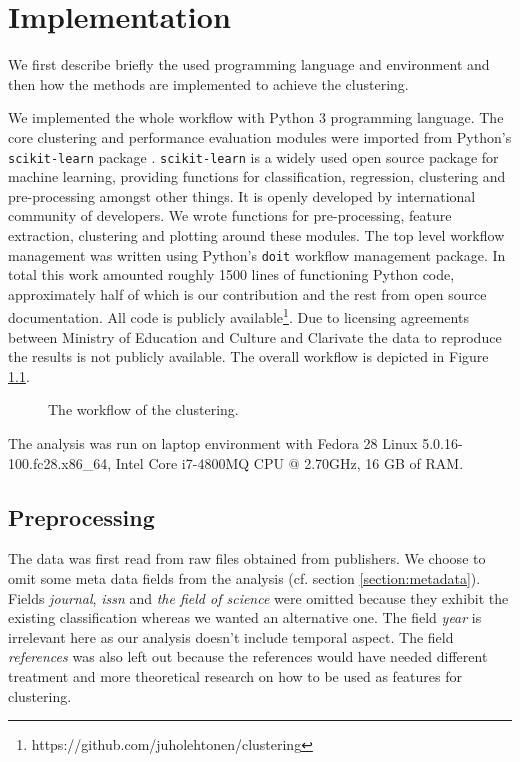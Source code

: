\chapter{Implementation}
\label{chapter:implementation}


We first describe briefly the used programming language and 
environment and then how the methods are implemented to achieve the 
clustering. 

We implemented the whole workflow with Python 3 programming 
language. The core clustering and performance evaluation modules
were imported from Python's \texttt{scikit-learn} package 
\cite{scikit-learn}. \texttt{scikit-learn} is a widely used open 
source package for machine learning, providing functions for 
classification, regression, clustering and pre-processing amongst 
other things. It is openly developed by international community of
developers. We wrote functions for pre-processing, feature 
extraction, clustering and plotting around these modules. 
The top level workflow management was written using Python's 
\texttt{doit} workflow management package. In total this work 
amounted roughly 1500 lines of functioning Python code, 
approximately half of which is our contribution and the rest from 
open source documentation. All code is publicly 
available\footnote{https://github.com/juholehtonen/clustering}. 
Due to licensing agreements between Ministry of Education and 
Culture and Clarivate the data to reproduce the results is not 
publicly available. The overall workflow is depicted in Figure 
\ref{fig:wf}.
\begin{figure}[ht]
  \begin{center}    
    
    \caption{The workflow of the clustering.}
    \label{fig:wf}
  \end{center}
\end{figure}
The analysis was run on laptop environment with Fedora 28 Linux 
5.0.16-100.fc28.x86\_64, Intel Core i7-4800MQ CPU @ 2.70GHz, 16 GB
of RAM.

\section{Preprocessing}
\label{sec:impl_preproc}
The data was first read from raw files obtained from publishers. 
We choose to omit some meta data fields from the analysis (cf. 
section \ref{section:metadata}). Fields \emph{journal}, 
\emph{issn} and \emph{the field of science} were omitted because 
they exhibit the existing classification whereas we wanted an 
alternative one. The field \emph{year} is irrelevant here as our 
analysis doesn't include temporal aspect. The field 
\emph{references} was also left out because the references 
would have needed different treatment and more theoretical research 
on how to be used as features for clustering.

